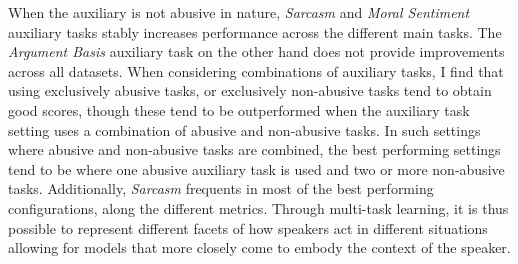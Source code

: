 When the auxiliary is not abusive in nature, \textit{Sarcasm} and \textit{Moral Sentiment} auxiliary tasks stably increases performance across the different main tasks.
The \textit{Argument Basis} auxiliary task on the other hand does not provide improvements across all datasets.
When considering combinations of auxiliary tasks, I find that using exclusively abusive tasks, or exclusively non-abusive tasks tend to obtain good scores, though these tend to be outperformed when the auxiliary task setting uses a combination of abusive and non-abusive tasks.
In such settings where abusive and non-abusive tasks are combined, the best performing settings tend to be where one abusive auxiliary task is used and two or more non-abusive tasks.
Additionally, \textit{Sarcasm} frequents in most of the best performing configurations, along the different metrics.
Through multi-task learning, it is thus possible to represent different facets of how speakers act in different situations allowing for models that more closely come to embody the context of the speaker.

